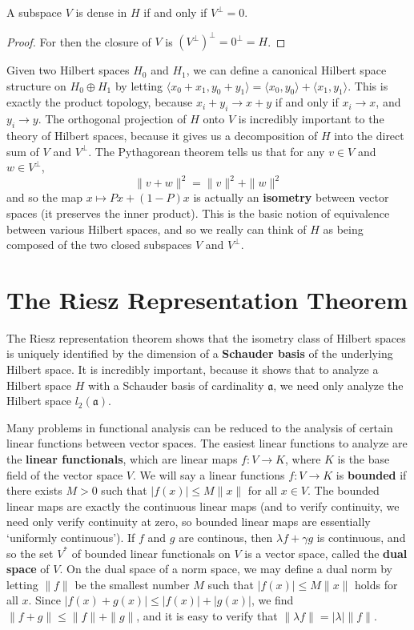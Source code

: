 \begin{corollary}
    A subspace $V$ is dense in $H$ if and only if $V^\perp = 0$.
\end{corollary}
\begin{proof}
    For then the closure of $V$ is $(V^\perp)^\perp = 0^\perp = H$.
\end{proof}

Given two Hilbert spaces $H_0$ and $H_1$, we can define a canonical Hilbert space structure on $H_0 \oplus H_1$ by letting $\langle x_0 + x_1, y_0 + y_1 \rangle = \langle x_0, y_0 \rangle + \langle x_1, y_1 \rangle$. This is exactly the product topology, because $x_i + y_i \to x + y$ if and only if $x_i \to x$, and $y_i \to y$. The orthogonal projection of $H$ onto $V$ is incredibly important to the theory of Hilbert spaces, because it gives us a decomposition of $H$ into the direct sum of $V$ and $V^\perp$. The Pythagorean theorem tells us that for any $v \in V$ and $w \in V^\perp$,
%
\[ \| v + w \|^2 = \| v \|^2 + \| w \|^2 \]
%
and so the map $x \mapsto Px + (1 - P)x$ is actually an {\bf isometry} between vector spaces (it preserves the inner product). This is the basic notion of equivalence between various Hilbert spaces, and so we really can think of $H$ as being composed of the two closed subspaces $V$ and $V^\perp$.

\section{The Riesz Representation Theorem}

The Riesz representation theorem shows that the isometry class of Hilbert spaces is uniquely identified by the dimension of a {\bf Schauder basis} of the underlying Hilbert space. It is incredibly important, because it shows that to analyze a Hilbert space $H$ with a Schauder basis of cardinality $\mathfrak{a}$, we need only analyze the Hilbert space $l_2(\mathfrak{a})$.

Many problems in functional analysis can be reduced to the analysis of certain linear functions between vector spaces. The easiest linear functions to analyze are the {\bf linear functionals}, which are linear maps $f: V \to K$, where $K$ is the base field of the vector space $V$. We will say a linear functions $f: V \to K$ is {\bf bounded} if there exists $M > 0$ such that $|f(x)| \leq M \| x \|$ for all $x \in V$. The bounded linear maps are exactly the continuous linear maps (and to verify continuity, we need only verify continuity at zero, so bounded linear maps are essentially `uniformly continuous'). If $f$ and $g$ are continous, then $\lambda f + \gamma g$ is continuous, and so the set $V^*$ of bounded linear functionals on $V$ is a vector space, called the {\bf dual space} of $V$. On the dual space of a norm space, we may define a dual norm by letting $\| f \|$ be the smallest number $M$ such that $|f(x)| \leq M \| x \|$ holds for all $x$. Since $|f(x) + g(x)| \leq |f(x)| + |g(x)|$, we find $\| f + g \| \leq \| f \| + \| g \|$, and it is easy to verify that $\| \lambda f \| = |\lambda| \| f \|$.

